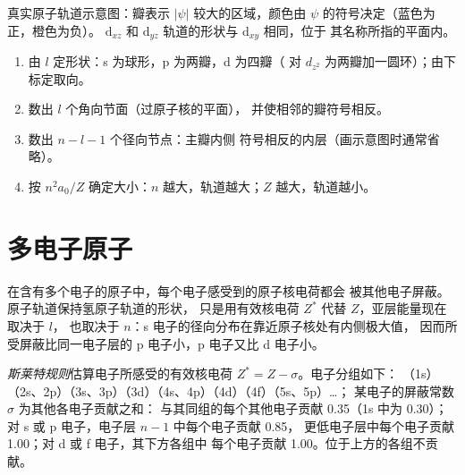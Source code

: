 \begin{omfigure}

{\small 真实原子轨道示意图：瓣表示 $|\psi|$
较大的区域，颜色由 $\psi$ 的符号决定（蓝色为正，橙色为负）。
$\mathrm d_{xz}$ 和 $\mathrm d_{yz}$ 轨道的形状与 $\mathrm d_{xy}$ 相同，位于
其名称所指的平面内。}
\end{omfigure}

\begin{method}[由量子数画原子轨道示意图]\label{met:b2:atomic-orbitals:draw-orbital}
\begin{enumerate}
  \item 由 $l$ 定形状：s 为球形，p 为两瓣，d 为四瓣（
        对 $d_{z^2}$ 为两瓣加一圆环）；由下标定取向。
  \item 数出 $l$ 个角向节面（过原子核的平面），
        并使相邻的瓣符号相反。
  \item 数出 $n - l - 1$ 个径向节点：主瓣内侧
        符号相反的内层（画示意图时通常省略）。
  \item 按 $n^2a_0/Z$ 确定大小：$n$ 越大，轨道越大；$Z$ 越大，轨道越小。
\end{enumerate}
\end{method}

\section{多电子原子}

在含有多个电子的原子中，每个电子感受到的原子核电荷都会
被其他电子屏蔽。原子轨道保持氢原子轨道的形状，
只是用有效核电荷 $Z^*$ 代替 $Z$，亚层能量现在取决于 $l$，
也取决于 $n$：s 电子的径向分布在靠近原子核处有内侧极大值，
因而所受屏蔽比同一电子层的 p 电子小，p 电子又比
d 电子小。

\begin{definition}[斯莱特规则]\label{def:b2:atomic-orbitals:slater}
\emph{斯莱特规则}估算电子所感受的有效核电荷
$Z^* = Z - \sigma$。电子分组如下：
（1s）（2s、2p）（3s、3p）（3d）（4s、4p）（4d）（4f）（5s、5p）\dots；
某电子的屏蔽常数 $\sigma$ 为其他各电子贡献之和：
与其同组的每个其他电子贡献 0.35（1s 中为 0.30）；
对 s 或 p 电子，电子层 $n - 1$ 中每个电子贡献 0.85，
更低电子层中每个电子贡献 1.00；对 d 或 f 电子，其下方各组中
每个电子贡献 1.00。位于上方的各组不贡献。
\end{definition}

